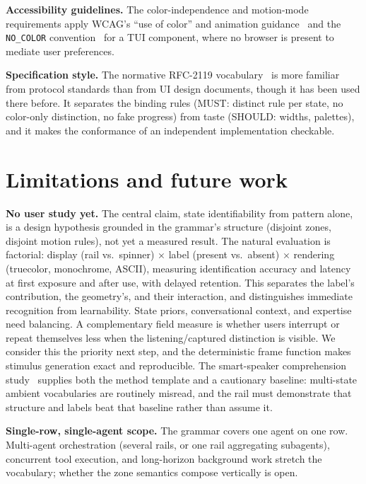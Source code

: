 \documentclass[11pt]{article}
\begin{document}
\textbf{Accessibility guidelines.} The color-independence and motion-mode
requirements apply WCAG's ``use of color'' and animation
guidance~\cite{wcag21} and the \texttt{NO\_COLOR} convention~\cite{nocolor}
for a TUI component, where no browser is present to mediate user
preferences.

\textbf{Specification style.} The normative RFC-2119
vocabulary~\cite{rfc2119} is more familiar from protocol standards than
from UI design documents, though it has been used there before. It separates the binding rules (MUST: distinct rule per
state, no color-only distinction, no fake progress) from taste (SHOULD:
widths, palettes), and it makes the conformance of an independent implementation checkable.

\section{Limitations and future work}
\label{sec:limitations}

\textbf{No user study yet.} The central claim, state identifiability from pattern alone, is a design hypothesis grounded in the grammar's
structure (disjoint zones, disjoint motion rules), not yet a measured
result. The natural evaluation is factorial: display (rail vs.\ spinner) $\times$ label (present vs.\ absent) $\times$ rendering (truecolor, monochrome, ASCII), measuring identification accuracy and latency at
first exposure and after use, with delayed retention. This separates the label's contribution, the geometry's, and their interaction, and distinguishes immediate recognition from learnability. State priors, conversational context,
and expertise need balancing. A complementary field measure is whether
users interrupt or repeat themselves less when the listening/captured
distinction is visible. We
consider this the priority next step, and the deterministic frame
function makes stimulus generation exact and reproducible. The
smart-speaker comprehension study~\cite{kunchay2021} supplies both the
method template and a cautionary baseline: multi-state ambient
vocabularies are routinely misread, and the rail must demonstrate that
structure and labels beat that baseline rather than assume it.

\textbf{Single-row, single-agent scope.} The grammar covers one agent on
one row. Multi-agent orchestration (several rails, or one rail
aggregating subagents), concurrent tool execution, and long-horizon
background work stretch the vocabulary; whether the zone semantics
compose vertically is open.
\end{document}
